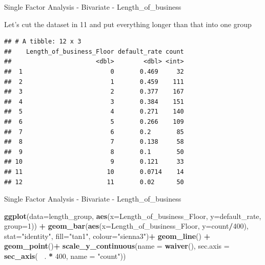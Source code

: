 \documentclass[9pt,ignorenonframetext,]{beamer}
\newenvironment{Shaded}{\begin{snugshade}}{\end{snugshade}}
\newcommand{\KeywordTok}[1]{\textcolor[rgb]{0.13,0.29,0.53}{\textbf{#1}}}
\newcommand{\DataTypeTok}[1]{\textcolor[rgb]{0.13,0.29,0.53}{#1}}
\newcommand{\DecValTok}[1]{\textcolor[rgb]{0.00,0.00,0.81}{#1}}
\newcommand{\StringTok}[1]{\textcolor[rgb]{0.31,0.60,0.02}{#1}}
\newcommand{\OperatorTok}[1]{\textcolor[rgb]{0.81,0.36,0.00}{\textbf{#1}}}
\newcommand{\NormalTok}[1]{#1}
\begin{document}
\begin{frame}[fragile]{Single Factor Analysis - Bivariate -
Length\_of\_business}

Let's cut the dataset in 11 and put everything longer than that into one
group

\begin{verbatim}
## # A tibble: 12 x 3
##    Length_of_business_Floor default_rate count
##                       <dbl>        <dbl> <int>
##  1                        0       0.469     32
##  2                        1       0.459    111
##  3                        2       0.377    167
##  4                        3       0.384    151
##  5                        4       0.271    140
##  6                        5       0.266    109
##  7                        6       0.2       85
##  8                        7       0.138     58
##  9                        8       0.1       50
## 10                        9       0.121     33
## 11                       10       0.0714    14
## 12                       11       0.02      50
\end{verbatim}

\end{frame}

\begin{frame}[fragile]{Single Factor Analysis - Bivariate -
Length\_of\_business}

\begin{Shaded}
\begin{Highlighting}[]
\KeywordTok{ggplot}\NormalTok{(}\DataTypeTok{data=}\NormalTok{length_group, }\KeywordTok{aes}\NormalTok{(}\DataTypeTok{x=}\NormalTok{Length_of_business_Floor,}
                              \DataTypeTok{y=}\NormalTok{default_rate, }\DataTypeTok{group=}\DecValTok{1}\NormalTok{)) }\OperatorTok{+}
\StringTok{    }\KeywordTok{geom_bar}\NormalTok{(}\KeywordTok{aes}\NormalTok{(}\DataTypeTok{x=}\NormalTok{Length_of_business_Floor, }\DataTypeTok{y=}\NormalTok{count}\OperatorTok{/}\DecValTok{400}\NormalTok{),}
             \DataTypeTok{stat=}\StringTok{"identity"}\NormalTok{,}
             \DataTypeTok{fill=}\StringTok{"tan1"}\NormalTok{, }\DataTypeTok{colour=}\StringTok{"sienna3"}\NormalTok{)}\OperatorTok{+}
\StringTok{    }\KeywordTok{geom_line}\NormalTok{() }\OperatorTok{+}
\StringTok{    }\KeywordTok{geom_point}\NormalTok{()}\OperatorTok{+}
\StringTok{    }\KeywordTok{scale_y_continuous}\NormalTok{(}\DataTypeTok{name =} \KeywordTok{waiver}\NormalTok{(),}
                       \DataTypeTok{sec.axis =} \KeywordTok{sec_axis}\NormalTok{(}\OperatorTok{~}\StringTok{ }\NormalTok{. }\OperatorTok{*}\StringTok{ }\DecValTok{400}\NormalTok{,}
                                           \DataTypeTok{name =} \StringTok{"count"}\NormalTok{))}
\end{Highlighting}
\end{Shaded}

\end{frame}
\end{document}
